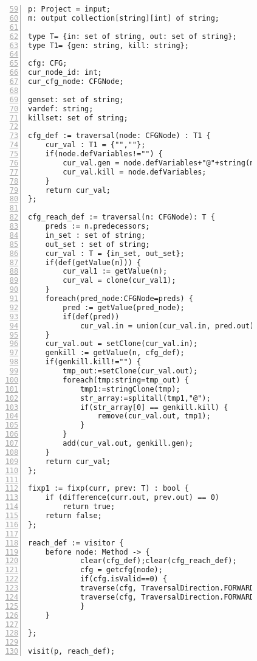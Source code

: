 \begin{figure}[ht!]
\begin{lstlisting}[numbers=left, tabsize=4, caption={Reaching definition analysis},label={lst:rd-code},firstline=59, firstnumber=59] 
p: Project = input;
m: output collection[string][int] of string;

type T= {in: set of string, out: set of string};
type T1= {gen: string, kill: string};

cfg: CFG;
cur_node_id: int;
cur_cfg_node: CFGNode;

genset: set of string;
vardef: string;
killset: set of string;

cfg_def := traversal(node: CFGNode) : T1 {
	cur_val : T1 = {"",""};
	if(node.defVariables!="") {
		cur_val.gen = node.defVariables+"@"+string(node.id);
		cur_val.kill = node.defVariables;
	}
	return cur_val;
};

cfg_reach_def := traversal(n: CFGNode): T {
	preds := n.predecessors;
	in_set : set of string;
	out_set : set of string;
	cur_val : T = {in_set, out_set};
	if(def(getValue(n))) {
		cur_val1 := getValue(n);
		cur_val = clone(cur_val1);
	}
	foreach(pred_node:CFGNode=preds) {	
		pred := getValue(pred_node);
		if(def(pred))
			cur_val.in = union(cur_val.in, pred.out);
	}
	cur_val.out = setClone(cur_val.in);
	genkill := getValue(n, cfg_def);
	if(genkill.kill!="") {
		tmp_out:=setClone(cur_val.out);
		foreach(tmp:string=tmp_out) {
			tmp1:=stringClone(tmp);
			str_array:=splitall(tmp1,"@");
			if(str_array[0] == genkill.kill) {
				remove(cur_val.out, tmp1);
			}
		}
		add(cur_val.out, genkill.gen);
	}
	return cur_val;
};

fixp1 := fixp(curr, prev: T) : bool {
	if (difference(curr.out, prev.out) == 0)
		return true;	
	return false;
};

reach_def := visitor {
	before node: Method -> {
			clear(cfg_def);clear(cfg_reach_def);
			cfg = getcfg(node);
			if(cfg.isValid==0) {
			traverse(cfg, TraversalDirection.FORWARD, TraversalKind.ITERATIVE, cfg_def);
			traverse(cfg, TraversalDirection.FORWARD, TraversalKind.HYBRID, cfg_reach_def, fixp1);
			}
	}

};

visit(p, reach_def);
\end{lstlisting}
\end{figure}